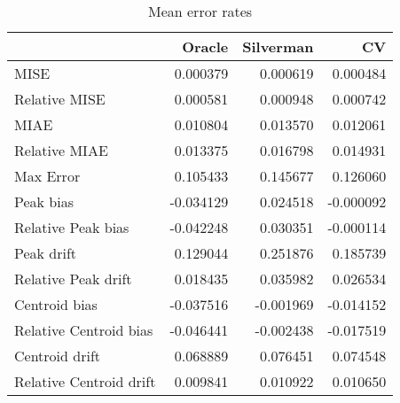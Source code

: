 \begin{table}[H]
\centering
\begin{tabular}{lrrr}
  \hline
 & Oracle & Silverman & CV \\ 
  \hline
MISE & 0.000379 & 0.000619 & 0.000484 \\ 
  Relative MISE & 0.000581 & 0.000948 & 0.000742 \\ 
  MIAE & 0.010804 & 0.013570 & 0.012061 \\ 
  Relative MIAE & 0.013375 & 0.016798 & 0.014931 \\ 
  Max Error & 0.105433 & 0.145677 & 0.126060 \\ 
  Peak bias & -0.034129 & 0.024518 & -0.000092 \\ 
  Relative Peak bias & -0.042248 & 0.030351 & -0.000114 \\ 
  Peak drift & 0.129044 & 0.251876 & 0.185739 \\ 
  Relative Peak drift & 0.018435 & 0.035982 & 0.026534 \\ 
  Centroid bias & -0.037516 & -0.001969 & -0.014152 \\ 
  Relative Centroid bias & -0.046441 & -0.002438 & -0.017519 \\ 
  Centroid drift & 0.068889 & 0.076451 & 0.074548 \\ 
  Relative Centroid drift & 0.009841 & 0.010922 & 0.010650 \\ 
   \hline
\end{tabular}
\caption{Mean error rates} 
\label{tbl:mean_error_rates}
\end{table}

